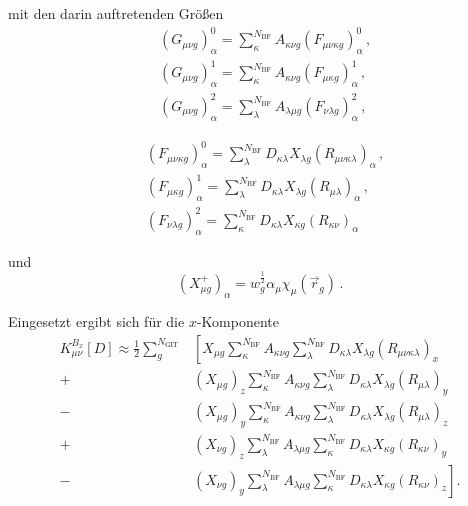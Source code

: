 	mit den darin auftretenden Größen
	\begin{equation}
	\begin{aligned}
	&(G_{\mu\nu g})_\alpha^0=\sum_\kappa^{N_{\textrm{BF}}}A_{\kappa\nu g}(F_{\mu\nu\kappa g})_\alpha^0\, ,\\
	&(G_{\mu\nu g})_\alpha^1=\sum_\kappa^{N_{\textrm{BF}}}A_{\kappa\nu g}(F_{\mu\kappa g})_\alpha^1\, ,\\
	&(G_{\mu\nu g})_\alpha^2=\sum_\lambda^{N_{\textrm{BF}}}A_{\lambda\mu g}(F_{\nu\lambda g})_\alpha^2\, ,
	\end{aligned}
	\end{equation}	
	
	\begin{equation}
	\begin{aligned}
	&(F_{\mu\nu\kappa g})_\alpha^0=\sum_\lambda^{N_{\textrm{BF}}}D_{\kappa\lambda}X_{\lambda g}(R_{\mu\nu\kappa\lambda})_\alpha\, ,\\
	&(F_{\mu\kappa g})_\alpha^1=\sum_\lambda^{N_{\textrm{BF}}}D_{\kappa\lambda}X_{\lambda g}(R_{\mu\lambda})_\alpha\, ,\\
	&(F_{\nu\lambda g})_\alpha^2=\sum_\kappa^{N_{\textrm{BF}}}D_{\kappa\lambda}X_{\kappa g}(R_{\kappa\nu})_\alpha
	\end{aligned}
	\end{equation}
	
	und
	\begin{equation}
	\left(X_{\mu g}^+\right)_\alpha=w_g^{\frac{1}{2}}\alpha_\mu\chi_\mu(\vec{r}_g)\, .
	\end{equation}
	
	Eingesetzt ergibt sich für die $x$-Komponente
	\begin{equation}
	\begin{aligned}
	K_{\mu\nu}^{B_x}[D]\approx\frac{1}{2}\sum_{g}^{N_{\textrm{GIT}}}&\left[X_{\mu g}\sum_\kappa^{N_{\textrm{BF}}}A_{\kappa\nu g}\sum_\lambda^{N_{\textrm{BF}}}D_{\kappa\lambda}X_{\lambda g}(R_{\mu\nu\kappa\lambda})_x\right.\\
	+&\left(X_{\mu g}\right)_z\sum_\kappa^{N_{\textrm{BF}}}A_{\kappa\nu g}\sum_\lambda^{N_{\textrm{BF}}}D_{\kappa\lambda}X_{\lambda g}(R_{\mu\lambda})_y\\
	-&\left(X_{\mu g}\right)_y\sum_\kappa^{N_{\textrm{BF}}}A_{\kappa\nu g}\sum_\lambda^{N_{\textrm{BF}}}D_{\kappa\lambda}X_{\lambda g}(R_{\mu\lambda})_z\\
	+&\left(X_{\nu g}\right)_z\sum_\lambda^{N_{\textrm{BF}}}A_{\lambda\mu g}\sum_\kappa^{N_{\textrm{BF}}}D_{\kappa\lambda}X_{\kappa g}(R_{\kappa\nu})_y\\
	-&\left.\left(X_{\nu g}\right)_y\sum_\lambda^{N_{\textrm{BF}}}A_{\lambda\mu g}\sum_\kappa^{N_{\textrm{BF}}}D_{\kappa\lambda}X_{\kappa g}(R_{\kappa\nu})_z\right].
	\end{aligned}
	\end{equation}

